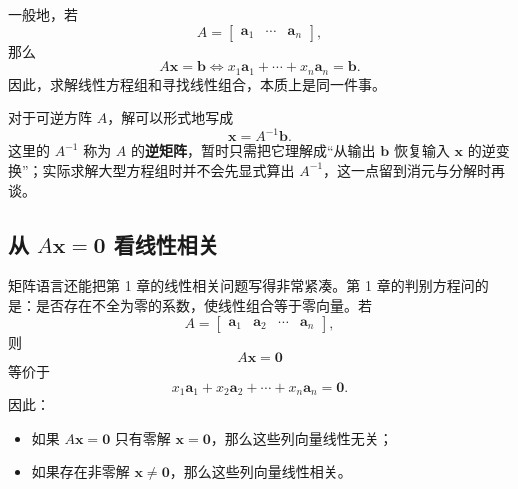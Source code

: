 \documentclass[UTF8,a4paper,12pt]{ctexart}
\numberwithin{equation}{section}
\begin{document}
	一般地，若
	\begin{equation}\label{eq:3.20}
	A=
	\begin{bmatrix}
		\bm{a}_1&\cdots&\bm{a}_n
	\end{bmatrix},
	\end{equation}
	那么
	\begin{equation}\label{eq:3.21}
	A\bm{x}=\bm{b}
	\iff
	x_1\bm{a}_1+\cdots+x_n\bm{a}_n=\bm{b}.
	\end{equation}
	因此，求解线性方程组和寻找线性组合，本质上是同一件事。
	
	对于可逆方阵 $A$，解可以形式地写成
	\begin{equation}\label{eq:3.22}
	\bm{x}=A^{-1}\bm{b}.
	\end{equation}
	这里的 $A^{-1}$ 称为 $A$ 的\textbf{逆矩阵}，暂时只需把它理解成“从输出 $\bm{b}$ 恢复输入 $\bm{x}$ 的逆变换”；实际求解大型方程组时并不会先显式算出 $A^{-1}$，这一点留到消元与分解时再谈。
	
	\subsection{从 \texorpdfstring{$A\bm{x}=\bm{0}$}{Ax=0} 看线性相关}
	
	矩阵语言还能把第 1 章的线性相关问题写得非常紧凑。第 1 章的判别方程问的是：是否存在不全为零的系数，使线性组合等于零向量。若
	\begin{equation}\label{eq:3.23}
	A=
	\begin{bmatrix}
		\bm{a}_1&\bm{a}_2&\cdots&\bm{a}_n
	\end{bmatrix},
	\end{equation}
	则
	\begin{equation}\label{eq:3.24}
	A\bm{x}=\bm{0}
	\end{equation}
	等价于
	\begin{equation}\label{eq:3.25}
	x_1\bm{a}_1+x_2\bm{a}_2+\cdots+x_n\bm{a}_n=\bm{0}.
	\end{equation}
	因此：
	\begin{itemize}
		\item 如果 $A\bm{x}=\bm{0}$ 只有零解 $\bm{x}=\bm{0}$，那么这些列向量线性无关；
		\item 如果存在非零解 $\bm{x}\neq\bm{0}$，那么这些列向量线性相关。
	\end{itemize}
	
\end{document}
